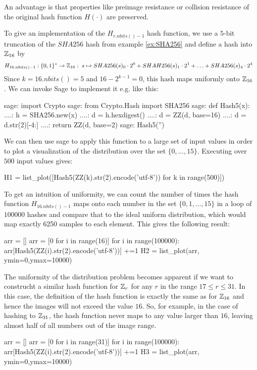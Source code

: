 An advantage is that properties like preimage resistance or collision resistance of the original hash function $H(\cdot)$ are preserved.
\begin{example} To give an implementation of the $H_{r.nbits()-1}$ hash function, we use a $5$-bit truncation of the $SHA256$ hash from example \ref{ex:SHA256} and define a hash into $\mathbb{Z}_{16}$ by
$$
H_{16.nbits()-1}: \{0,1\}^* \to \mathbb{Z}_{16}:\; s\mapsto
SHA256(s)_0\cdot 2^0 + SHAH256(s)_1\cdot 2^1 + \ldots + SHA256(s)_4\cdot 2^4 
$$
Since $k=16.nbits()=5$ and $16-2^{k-1}=0$, this hash maps uniformly onto $\mathbb{Z}_{16}$. We can invoke Sage to implement it e.g. like this:
\begin{sagecommandline}
sage: import Crypto 
sage: from Crypto.Hash import SHA256
sage: def Hash5(x):
....:     h = SHA256.new(x)
....:     d = h.hexdigest()
....:     d = ZZ(d, base=16)
....:     d = d.str(2)[-4:]
....:     return ZZ(d, base=2)
sage: Hash5('')
\end{sagecommandline}
We can then use sage to apply this function to a large set of input values in order to plot a visualization of the distribution over the set $\{0,\ldots,15\}$. Executing over $500$ input values gives:
\begin{sagesilent}
H1 = list_plot([Hash5(ZZ(k).str(2).encode('utf-8')) for k in range(500)])
\end{sagesilent}
\begin{center} 
\end{center}
To get an intuition of uniformity, we can count the number of times the hash function $H_{16.nbits()-1}$ maps onto each number in the set $\{0,1,\ldots,15\}$ in a loop of $100000$ hashes and compare that to the ideal uniform distribution, which would map exactly 6250 samples to each element. This gives the following result:
\begin{sagesilent}
arr = []
arr = [0 for i in range(16)]
for i in range(100000):
    arr[Hash5(ZZ(i).str(2).encode('utf-8'))] +=1
H2 = list_plot(arr, ymin=0,ymax=10000)
\end{sagesilent}
\begin{center} 
\end{center}
The uniformity of the distribution problem becomes apparent if we want to construcht a similar hash function for $\mathbb{Z}_r$ for any $r$ in the range $17\leq r \leq 31$. In this case, the definition of the hash function is exactly the same as for $\mathbb{Z}_{16}$ and hence the images will not exceed the value $16$. So, for example, in the case of hashing to $\mathbb{Z}_{31}$, the hash function never maps to any value larger than $16$, leaving almost half of all numbers out of the image range.
\begin{sagesilent}
arr = []
arr = [0 for i in range(31)]
for i in range(100000):
    arr[Hash5(ZZ(i).str(2).encode('utf-8'))] +=1
H3 = list_plot(arr, ymin=0,ymax=10000)
\end{sagesilent}
\begin{center} 
\end{center}
\end{example}
 
